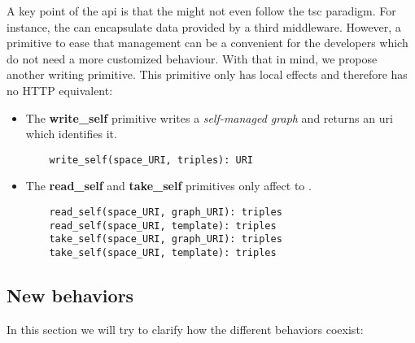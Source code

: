 A key point of the \ac{api} is that the \asteroids{} might not even follow the \ac{tsc} paradigm.
For instance, the \osapi{} can encapsulate data provided by a third middleware.
However, a primitive to ease that management can be a convenient for the developers which do not need a more customized behaviour.
With that in mind, we propose another writing primitive.
This primitive only has local effects and therefore has no HTTP equivalent:
\begin{itemize}
  \item The \textbf{write\_self} primitive writes a \emph{self-managed graph} and returns an \ac{uri} which identifies it.
  
  \begin{lstlisting}
    write_self(space_URI, triples): URI
  \end{lstlisting}
  
  \item The \textbf{read\_self} and \textbf{take\_self} primitives only affect to \selfgraphs{}.
  
  \begin{lstlisting}
    read_self(space_URI, graph_URI): triples
    read_self(space_URI, template): triples
    take_self(space_URI, graph_URI): triples
    take_self(space_URI, template): triples
  \end{lstlisting}
  
\end{itemize}



\subsection{New behaviors}

In this section we will try to clarify how the different behaviors coexist:

